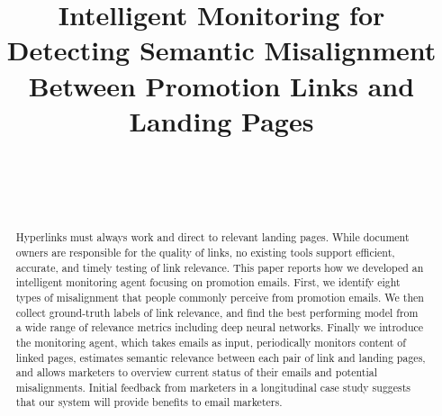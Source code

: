 \documentclass{sigchi}
\def\plaintitle{Intelligent Monitoring for Detecting Semantic Misalignment Between Promotion Links and Landing Pages}
\begin{document}
\title{\plaintitle}

\author{%
  \\
  \\
  \\
}

\maketitle

\begin{abstract}
  Hyperlinks must always work and direct to relevant landing pages. While document owners are responsible for the quality of links, no existing tools support efficient, accurate, and timely testing of link relevance. This paper reports how we developed an intelligent monitoring agent focusing on promotion emails. First, we identify eight types of misalignment that people commonly perceive from promotion emails. We then collect ground-truth labels of link relevance, and find the best performing model from a wide range of relevance metrics including deep neural networks. Finally we introduce the monitoring agent, which takes emails as input, periodically monitors content of linked pages, estimates semantic relevance between each pair of link and landing pages, and allows marketers to overview current status of their emails and potential misalignments. Initial feedback from marketers in a longitudinal case study suggests that our system will provide benefits to email marketers. 
\end{abstract}

\end{document}
